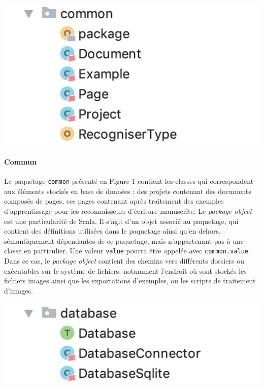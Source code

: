 \begin{mdframed}[frametitle={Figure 1 : Paquetage \texttt{common}}, innerbottommargin=10]
\begin{center}
\includegraphics[scale=0.7]{assets/common.png}
\end{center}
\end{mdframed}

\paragraph{Commun}
Le paquetage \texttt{common} présenté en Figure 1 contient les classes qui correspondent aux éléments stockés en base de données : des projets contenant des documents composés de pages, ces pages contenant après traitement des exemples d'apprentissage pour les reconnaisseurs d'écriture manuscrite. Le \textit{package object} est une particularité de Scala. Il s'agit d'un objet associé au paquetage, qui contient des définitions utilisées dans le paquetage ainsi qu'en dehors, sémantiquement dépendantes de ce paquetage, mais n'appartenant pas à une classe en particulier. Une valeur \texttt{value} pourra être appelée avec \texttt{common.value}. Dans ce cas, le \textit{package object} contient des chemins vers différents dossiers ou exécutables sur le système de fichiers, notamment l'endroit où sont stockés les fichiers images ainsi que les exportations d'exemples, ou les scripts de traitement d'images.

\begin{mdframed}[frametitle={Figure 2 : Paquetage \texttt{database}}, innerbottommargin=10]
\begin{center}
\includegraphics[scale=0.7]{assets/database.png}
\end{center}
\end{mdframed}

